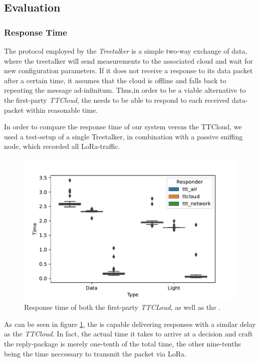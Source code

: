 \subsection{Evaluation}
\label{sec:evaluation}


\subsubsection{Response Time}
\label{sec:evaluation:response-time}

The protocol employed by the \textit{Treetalker} is a simple two-way exchange of data, where the treetalker will send measurements to the associated cloud and wait for new configuration parameters.
If it does not receive a response to its data packet after a certain time, it assumes that the cloud is offline and falls back to repeating the message ad-infinitum.
Thus,in order to be a viable alternative to the first-party \textit{TTCloud}, the \textit{\ttt} needs to be able to respond to each received data-packet within reasonable time.

In order to compare the response time of our system versus the TTCloud, we used a test-setup of a single Treetalker, in combination with a passive sniffing node, which recorded all LoRa-traffic.

\begin{figure}
    \centering
    \includegraphics[width=.8\linewidth]{figures/response_times.pdf}
    \caption{Response time of both the first-party \textit{TTCLoud}, as well as the \textit{\ttt}.}
    \label{fig:evaluation:ttt_response}
\end{figure}

As can be seen in figure \ref{fig:evaluation:ttt_response}, the \ttt is capable delivering responses with a similar delay as the \textit{TTCloud}.
In fact, the actual time it takes to arrive at a decision and craft the reply-package is merely one-tenth of the total time, the other nine-tenths being the time neccessary to transmit the packet via LoRa.

